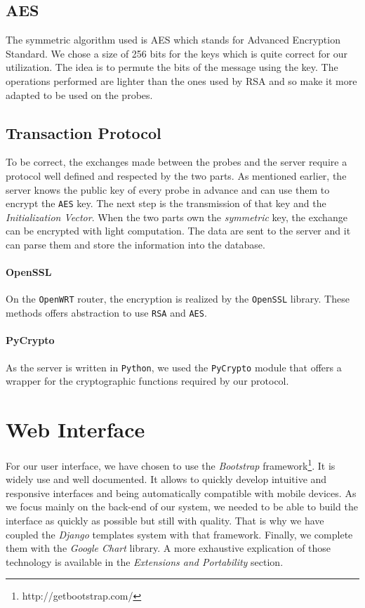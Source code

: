 \subsection{AES}
The symmetric algorithm used is AES which stands for Advanced Encryption Standard. We chose a size of 256 bits for the keys which is quite correct for our utilization. The idea is to permute the bits of the message using the key. The operations performed are lighter than the ones used by RSA and so make it more adapted to be used on the probes.


\subsection{Transaction Protocol}
To be correct, the exchanges made between the probes and the server require a protocol well defined and respected by the two parts. As mentioned earlier, the server knows the public key of every probe in advance and can use them to encrypt the \texttt{AES} key. The next step is the transmission of that key and the \emph{Initialization Vector}. When the two parts own the \emph{symmetric} key, the exchange can be encrypted with light computation. The data are sent to the server and it can parse them and store the information into the database.
\paragraph*{OpenSSL}
On the \texttt{OpenWRT} router, the encryption is realized by the \texttt{OpenSSL} library. These methods offers abstraction to use \texttt{RSA} and \texttt{AES}.

\paragraph*{PyCrypto} As the server is written in \texttt{Python}, we used the \texttt{PyCrypto} module that offers a wrapper for the cryptographic functions required by our protocol.

\section{Web Interface}
For our user interface, we have chosen to use the \emph{Bootstrap} framework\footnote{http://getbootstrap.com/}. It is widely use and well documented. It allows to quickly develop intuitive and responsive interfaces and being automatically compatible with mobile devices. As we focus mainly on the back-end of our system, we needed to be able to build the interface as quickly as possible but still with quality. That is why we have coupled the \emph{Django} templates system with that framework. Finally, we complete them with the \emph{Google Chart} library. A more exhaustive explication of those technology is available in the \emph{Extensions and Portability} section.


